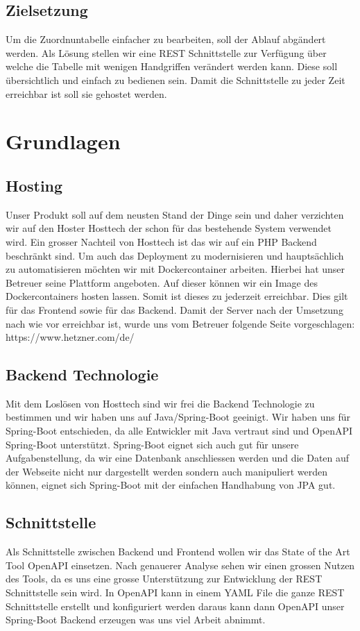 \documentclass[a4paper]{article}
\begin{document}
	\subsection{Zielsetzung}
	Um die Zuordnuntabelle einfacher zu bearbeiten, soll der Ablauf abgändert werden. Als Lösung stellen wir eine REST Schnittstelle zur Verfügung über welche die Tabelle mit wenigen Handgriffen verändert werden kann. 
	Diese soll übersichtlich und einfach zu bedienen sein. Damit die Schnittstelle zu jeder Zeit erreichbar ist soll sie gehostet werden.
	
	\section{Grundlagen}
	
	\subsection{Hosting}
	Unser Produkt soll auf dem neusten Stand der Dinge sein und daher verzichten wir auf den Hoster Hosttech der schon für das bestehende System verwendet wird. Ein grosser Nachteil von Hosttech ist das wir auf ein PHP Backend beschränkt sind. Um auch das Deployment zu modernisieren und hauptsächlich zu automatisieren möchten wir mit Dockercontainer arbeiten. Hierbei hat unser Betreuer seine Plattform angeboten. Auf dieser können wir ein Image des Dockercontainers hosten lassen. Somit ist dieses zu jederzeit erreichbar. Dies gilt für das Frontend sowie für das Backend.
	Damit der Server nach der Umsetzung nach wie vor erreichbar ist, wurde uns vom Betreuer folgende Seite vorgeschlagen: https://www.hetzner.com/de/
	
	\subsection{Backend Technologie}
	Mit dem Loslösen von Hosttech sind wir frei die Backend Technologie zu bestimmen und wir haben uns auf Java/Spring-Boot geeinigt. Wir haben uns für Spring-Boot entschieden, da alle Entwickler mit Java vertraut sind und OpenAPI Spring-Boot unterstützt. Spring-Boot eignet sich auch gut für unsere Aufgabenstellung, da wir eine Datenbank anschliessen werden und die Daten auf der Webseite nicht nur dargestellt werden sondern auch manipuliert werden können, eignet sich Spring-Boot mit der einfachen Handhabung von JPA gut.
	
	\subsection{Schnittstelle}
	Als Schnittstelle zwischen Backend und Frontend wollen wir das State of the Art Tool OpenAPI einsetzen. Nach genauerer Analyse sehen wir einen grossen Nutzen des Tools, da es uns eine grosse Unterstützung zur Entwicklung der REST Schnittstelle sein wird. In OpenAPI kann in einem YAML File die ganze REST Schnittstelle erstellt und konfiguriert werden daraus kann dann OpenAPI unser Spring-Boot Backend erzeugen was uns viel Arbeit abnimmt.
	
\end{document}
